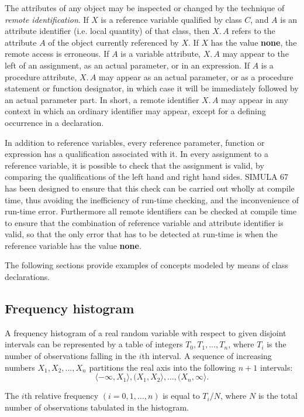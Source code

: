 The attributes of any object may be inspected or changed by the technique of \textit{remote identification}. If $X$ is a reference variable qualified by class $C$, and $A$ is an attribute identifier (i.e. local quantity) of that class, then $X.\,A$ refers to the attribute $A$ of the object currently referenced by $X$. If $X$ has the value \textbf{none}, the remote access is erroneous. If $A$ is a variable attribute, $X.\,A$ may appear to the left of an assignment, as an actual parameter, or in an expression. If $A$ is a procedure attribute, $X.\,A$ may appear as an actual parameter, or as a procedure statement or function designator, in which case it will be immediately followed by an actual parameter part. In short, a remote identifier $X.\,A$ may appear in any context in which an ordinary identifier may appear, except for a defining occurrence in a declaration.

In addition to reference variables, every reference parameter, function or expression has a qualification associated with it. In every assignment to a reference variable, it is possible to check that the assignment is valid, by comparing the qualifications of the left hand and right hand sides. SIMULA 67 has been designed to ensure that this check can be carried out wholly at compile time, thus avoiding the inefficiency of run-time checking, and the inconvenience of run-time error. Furthermore all remote identifiers can be checked at compile time to ensure that the combination of reference variable and attribute identifier is valid, so that the only error that has to be detected at run-time is when the reference variable has the value \textbf{none}.

The following sections provide examples of concepts modeled by means of class declarations.


\subsection{Frequency histogram}
\label{sec:frequency-histogram}

A frequency histogram of a real random variable with respect to given disjoint intervals can be represented by a table of integers $T_0, T_1, \dots, T_n$, where $T_i$ is the number of observations falling in the $i$th interval. A sequence of increasing numbers $X_1, X_2, \dots, X_n$ partitions the real axis into the following $n + 1$ intervals:
$$
\langle -\infty, X_1\rangle, (X_1, X_2\rangle, \dots, (X_n, \infty\rangle.
$$

\noindent
The $i$th relative frequency $(i = 0, 1, \dots, n)$ is equal to $T_i / N$, where $N$ is the total number of observations tabulated in the histogram.

